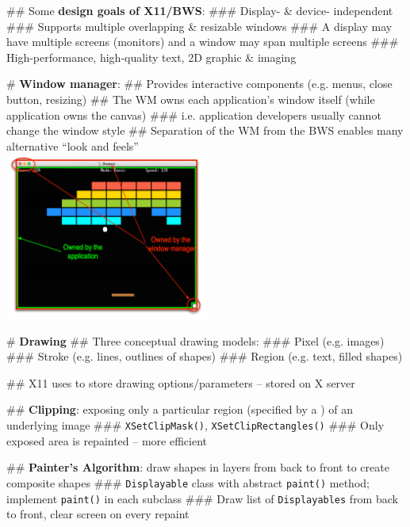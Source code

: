 \documentclass[11pt, oneside]{article}
\newcommand*{\un}[1]{\underline{\smash{#1}}}        %
\begin{document}
## Some \textbf{design goals of X11/BWS}:
### Display- \& device- independent
### Supports multiple overlapping \& resizable windows
### A display may have multiple screens (monitors) and a window may span multiple screens
### High-performance, high-quality text, 2D graphic \& imaging

# \textbf{Window manager}:
## Provides interactive components (e.g. menus, close button, resizing)
## The WM owns each application's window itself (while application owns the canvas)
### i.e. application developers usually cannot change the window style
## Separation of the WM from the BWS enables many alternative ``look and feels'' \\
\includegraphics[width=0.5\textwidth]{res/wm.png}

# \textbf{Drawing}
## Three conceptual drawing models:
### Pixel (e.g. images)
### Stroke (e.g. lines, outlines of shapes)
### Region (e.g. text, filled shapes)

## X11 uses \un{graphics contexts} to store drawing options/parameters -- stored on X server

## \textbf{Clipping}: exposing only a particular region (specified by a \un{mask}) of an underlying image
### \texttt{XSetClipMask()}, \texttt{XSetClipRectangles()}
### Only exposed area is repainted -- more efficient

## \textbf{Painter's Algorithm}: draw shapes in layers from back to front to create composite shapes
### \texttt{Displayable} class with abstract \texttt{paint()} method; implement \texttt{paint()} in each subclass
### Draw list of \texttt{Displayables} from back to front, clear screen on every repaint
\end{document}
